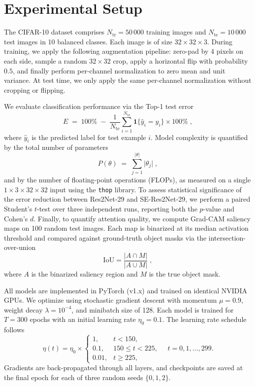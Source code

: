 \documentclass{article}
\begin{document}
\section{Experimental Setup}
The CIFAR-10 dataset comprises \(N_{\mathrm{tr}} = 50\,000\) training images and \(N_{\mathrm{te}} = 10\,000\) test images in 10 balanced classes.  Each image is of size \(32\times32\times3\).  During training, we apply the following augmentation pipeline: zero-pad by 4 pixels on each side, sample a random \(32\times32\) crop, apply a horizontal flip with probability \(0.5\), and finally perform per-channel normalization to zero mean and unit variance.  At test time, we only apply the same per-channel normalization without cropping or flipping.  

We evaluate classification performance via the Top-1 test error
\[
E \;=\; 100\% \;-\; \frac{1}{N_{\mathrm{te}}}\sum_{i=1}^{N_{\mathrm{te}}}\mathbf{1}\{\hat y_i = y_i\}\times100\%\;,
\]
where \(\hat y_i\) is the predicted label for test example \(i\).  Model complexity is quantified by the total number of parameters
\[
P(\theta) \;=\;\sum_{j=1}^{|\theta|}\bigl|\theta_j\bigr|\;,
\]
and by the number of floating-point operations (FLOPs), as measured on a single \(1\times3\times32\times32\) input using the \texttt{thop} library.  To assess statistical significance of the error reduction between Res2Net-29 and SE-Res2Net-29, we perform a paired Student’s \(t\)-test over three independent runs, reporting both the \(p\)-value and Cohen’s \(d\).  Finally, to quantify attention quality, we compute Grad-CAM saliency maps on 100 random test images.  Each map is binarized at its median activation threshold and compared against ground-truth object masks via the intersection-over-union
\[
\mathrm{IoU} = \frac{\lvert A \cap M\rvert}{\lvert A \cup M\rvert}\;,
\]
where \(A\) is the binarized saliency region and \(M\) is the true object mask.

All models are implemented in PyTorch (v1.x) and trained on identical NVIDIA GPUs.  We optimize using stochastic gradient descent with momentum \(\mu = 0.9\), weight decay \(\lambda = 10^{-4}\), and minibatch size of 128.  Each model is trained for \(T=300\) epochs with an initial learning rate \(\eta_0 = 0.1\).  The learning rate schedule follows
\[
\eta(t) = \eta_0 \times
\begin{cases}
1,     & t < 150,\\
0.1,   & 150 \le t < 225,\\
0.01,  & t \ge 225,
\end{cases}
\quad t = 0,1,\dots,299.
\]
Gradients are back-propagated through all layers, and checkpoints are saved at the final epoch for each of three random seeds \(\{0,1,2\}\).
\end{document}
